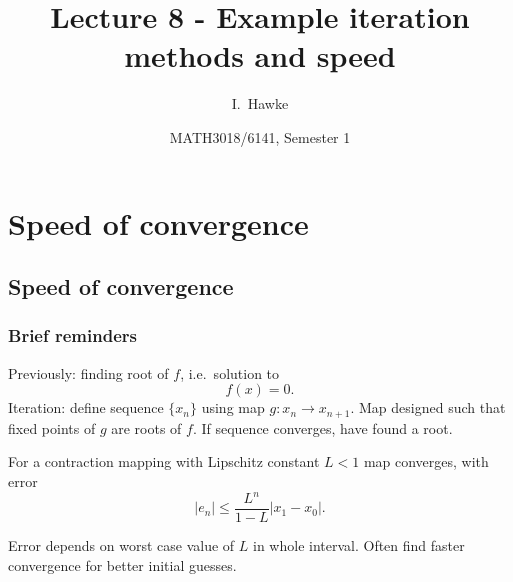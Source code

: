 \documentclass{beamer}
\title[Lecture 8] %
{Lecture 8 - Example iteration methods and speed}
\author[I. Hawke] %
{I.~Hawke}
\institute[University of Southampton] %
{
  School of Mathematics, \\
  University of Southampton, UK
}
\date[Semester 1] %
{MATH3018/6141, Semester 1}
\begin{document}
\begin{frame}
  \titlepage
\end{frame}


\section{Speed of convergence}

\subsection{Speed of convergence}

\begin{frame}
  \frametitle{Brief reminders}

  Previously: finding root of $f$, i.e.\ solution to
  \begin{equation*}
    f(x) = 0.
  \end{equation*}
  Iteration: define sequence $\{x_n\}$ using map $g : x_n
  \rightarrow x_{n+1}$. Map designed such that fixed points of
  $g$ are roots of $f$. If sequence converges, have found a root. \pause

  \vspace{1ex}

  For a contraction mapping with Lipschitz constant $L < 1$ map converges, with error
  \begin{equation*}
    |e_n| \leq \frac{L^n}{1 - L} |x_1 - x_0|.
  \end{equation*} \pause

  \vspace{1ex}

  Error depends on worst case value of $L$ in whole interval. Often find faster convergence for better initial guesses.

\end{frame}
\end{document}
